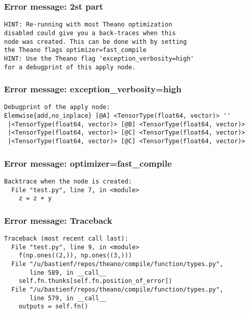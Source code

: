 \documentclass[utf8x,xcolor=pdftex,dvipsnames,table]{beamer}
\begin{document}
\begin{frame}[fragile]
  \frametitle{Error message: 2st part}

\begin{lstlisting}
HINT: Re-running with most Theano optimization
disabled could give you a back-traces when this
node was created. This can be done with by setting
the Theano flags optimizer=fast_compile
HINT: Use the Theano flag 'exception_verbosity=high'
for a debugprint of this apply node.
\end{lstlisting}
\end{frame}

\begin{frame}[fragile]
  \frametitle{Error message: exception\_verbosity=high}

\begin{lstlisting}
Debugprint of the apply node:
Elemwise{add,no_inplace} [@A] <TensorType(float64, vector)> ''
 |<TensorType(float64, vector)> [@B] <TensorType(float64, vector)>
 |<TensorType(float64, vector)> [@C] <TensorType(float64, vector)>
 |<TensorType(float64, vector)> [@C] <TensorType(float64, vector)>
\end{lstlisting}
\end{frame}

\begin{frame}[fragile]
  \frametitle{Error message: optimizer=fast\_compile}

\begin{lstlisting}
Backtrace when the node is created:
  File "test.py", line 7, in <module>
    z = z + y

\end{lstlisting}
\end{frame}

\begin{frame}[fragile]
  \frametitle{Error message: Traceback}

\begin{lstlisting}
Traceback (most recent call last):
  File "test.py", line 9, in <module>
    f(np.ones((2,)), np.ones((3,)))
  File "/u/bastienf/repos/theano/compile/function/types.py",
       line 589, in __call__
    self.fn.thunks[self.fn.position_of_error])
  File "/u/bastienf/repos/theano/compile/function/types.py",
       line 579, in __call__
    outputs = self.fn()

\end{lstlisting}
\end{frame}
\end{document}
